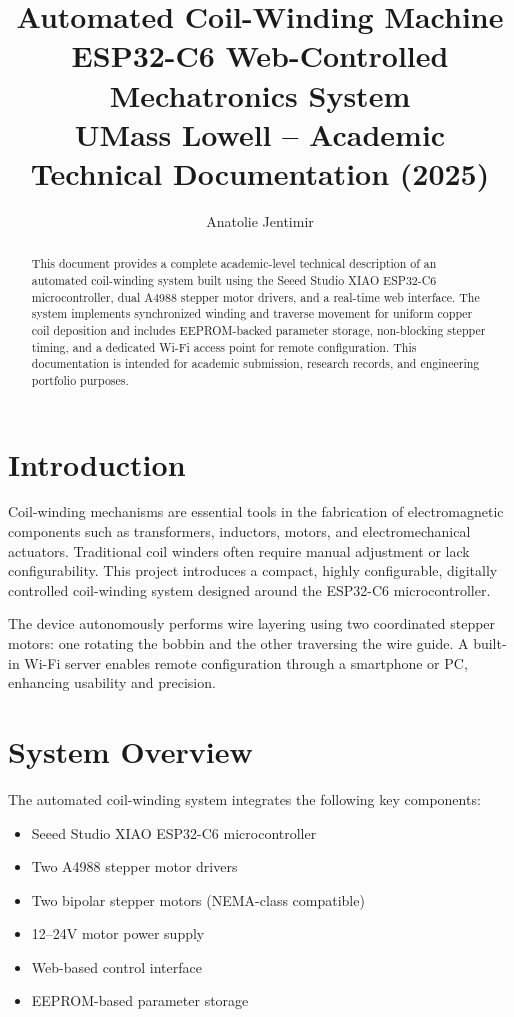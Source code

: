 \documentclass[12pt]{article}
\title{\textbf{\Large Automated Coil-Winding Machine}\\[6pt]
{\normalsize ESP32-C6 Web-Controlled Mechatronics System}\\[4pt]
{\small UMass Lowell -- Academic Technical Documentation (2025)}}
\author{Anatolie Jentimir}
\date{}
\begin{document}
\maketitle

\begin{abstract}
This document provides a complete academic-level technical description of an automated coil-winding system built using the Seeed Studio XIAO ESP32-C6 microcontroller, dual A4988 stepper motor drivers, and a real-time web interface. The system implements synchronized winding and traverse movement for uniform copper coil deposition and includes EEPROM-backed parameter storage, non-blocking stepper timing, and a dedicated Wi-Fi access point for remote configuration. This documentation is intended for academic submission, research records, and engineering portfolio purposes.
\end{abstract}

\section{Introduction}

Coil-winding mechanisms are essential tools in the fabrication of electromagnetic components such as transformers, inductors, motors, and electromechanical actuators. Traditional coil winders often require manual adjustment or lack configurability. This project introduces a compact, highly configurable, digitally controlled coil-winding system designed around the ESP32-C6 microcontroller.

The device autonomously performs wire layering using two coordinated stepper motors: one rotating the bobbin and the other traversing the wire guide. A built-in Wi-Fi server enables remote configuration through a smartphone or PC, enhancing usability and precision.

\section{System Overview}

The automated coil-winding system integrates the following key components:
\begin{itemize}
    \item Seeed Studio XIAO ESP32-C6 microcontroller
    \item Two A4988 stepper motor drivers
    \item Two bipolar stepper motors (NEMA-class compatible)
    \item 12--24V motor power supply
    \item Web-based control interface
    \item EEPROM-based parameter storage
\end{itemize}
\end{document}
